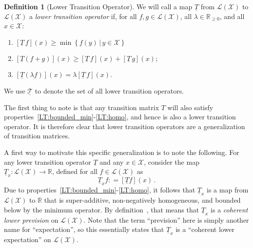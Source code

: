 \documentclass[10pt,a4paper]{paper}
\theoremstyle{definition}
\newtheorem{definition}{Definition}
\newcommand{\reals}{\mathbb{R}}
\newcommand{\realsnonneg}{\reals_{\geq 0}}
\newcommand{\states}{\mathcal{X}}
\newcommand{\lt}{\underline{T}}
\newcommand{\gambles}{\mathcal{L}}
\newcommand{\gamblesX}{\gambles(\states)}
\newcommand{\coloneqq}{:\!=}
\begin{document}
\begin{definition}[Lower Transition Operator]\label{def:coh_low_trans}
We will call a map $\lt$ from $\gamblesX$ to $\gamblesX$ a \emph{lower transition operator} if, for all $f,g\in\gamblesX$, all $\lambda\in\realsnonneg$, and all $x\in\states$:
\begin{enumerate}[label=LT\arabic*:,ref=LT\arabic*]
\item
$\left[\lt\,f\right](x)\geq\min\left\{f(y)\,\vert\,y\in\states\right\}$ \label{LT:bounded_min}
\item
$\left[\lt(f+g)\right](x)\geq \left[\lt\,f\right](x)+\left[\lt\,g\right](x)$; \label{LT:super_additive}
\item
$\left[\lt(\lambda f)\right](x)=\lambda\left[\lt\,f\right](x)$. \label{LT:homo}
\end{enumerate}
\noindent We use $\underline{\mathcal{T}}$ to denote the set of all lower transition operators.
\vspace{5pt}
\end{definition}
The first thing to note is that any transition matrix $T$ will also satisfy properties~\ref{LT:bounded_min}-\ref{LT:homo}, and hence is also a lower transition operator. It is therefore clear that lower transition operators are a generalization of transition matrices.

A first way to motivate this specific generalization is to note the following. For any lower transition operator $\lt$ and any $x\in\states$, consider the map $\lt_x:\gamblesX\to\reals$, defined for all $f\in\gamblesX$ as
\begin{equation}\label{eq:lowerprevisionfromlt}
\lt_xf \coloneqq \left[\lt f\right](x)\,.
\end{equation}
Due to properties~\ref{LT:bounded_min}-\ref{LT:homo}, it follows that $\lt_x$ is a map from $\gamblesX$ to $\reals$ that is super-additive, non-negatively homogeneous, and bounded below by the minimum operator. By definition~\cite[Definition~2.3.3]{Walley:1991vk}, that means that $\lt_x$ is a \emph{coherent lower prevision} on $\gamblesX$. Note that the term ``prevision'' here is simply another name for ``expectation'', so this essentially states that $\lt_x$ is a ``coherent lower expectation'' on $\gamblesX$.
\end{document}
